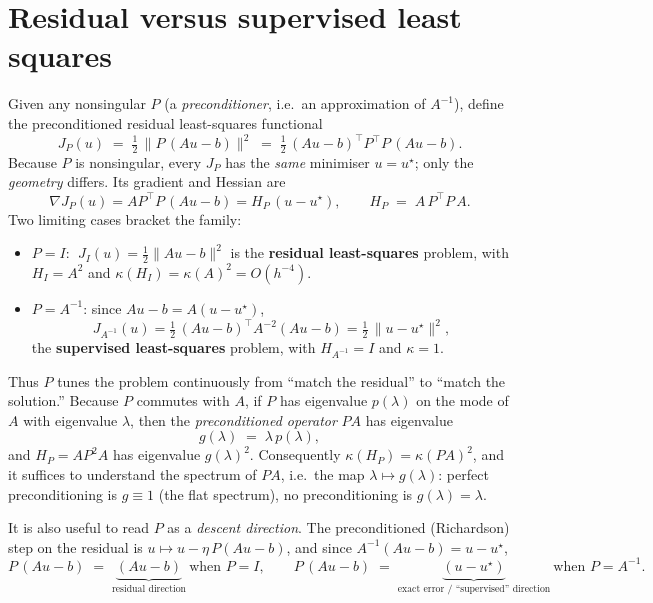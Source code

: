 \documentclass[11pt]{article}
\newcommand{\kk}{\kappa}
\newcommand{\ustar}{u^\star}
\begin{document}
\section{Residual versus supervised least squares}

Given any nonsingular $P$ (a \emph{preconditioner}, i.e.\ an approximation of $A^{-1}$),
define the preconditioned residual least-squares functional
\begin{equation}
  J_P(u) \;=\; \tfrac12\,\big\| P\,(Au-b) \big\|^2
          \;=\; \tfrac12\,(Au-b)^\top P^\top P\,(Au-b).
  \label{eq:JP}
\end{equation}
Because $P$ is nonsingular, every $J_P$ has the \emph{same} minimiser $u=\ustar$; only the
\emph{geometry} differs. Its gradient and Hessian are
\begin{equation}
  \nabla J_P(u) = A P^\top P\,(Au-b) = H_P\,(u-\ustar),
  \qquad
  H_P \;=\; A\,P^\top P\,A .
  \label{eq:hessian}
\end{equation}
Two limiting cases bracket the family:
\begin{itemize}
  \item $P=I$: $\;J_I(u)=\tfrac12\|Au-b\|^2$ is the \textbf{residual least-squares}
        problem, with $H_I = A^2$ and $\kk(H_I)=\kk(A)^2 = O(h^{-4})$.
  \item $P=A^{-1}$: since $Au-b = A(u-\ustar)$,
        \begin{equation}
          J_{A^{-1}}(u) = \tfrac12\,(Au-b)^\top A^{-2}(Au-b)
                        = \tfrac12\,\|u-\ustar\|^2 ,
        \end{equation}
        the \textbf{supervised least-squares} problem, with $H_{A^{-1}}=I$ and $\kk=1$.
\end{itemize}
Thus $P$ tunes the problem continuously from ``match the residual'' to ``match the
solution.'' Because $P$ commutes with $A$, if $P$ has eigenvalue $p(\lambda)$ on the mode of
$A$ with eigenvalue $\lambda$, then the \emph{preconditioned operator} $PA$ has eigenvalue
\begin{equation}
  g(\lambda) \;=\; \lambda\,p(\lambda),
\end{equation}
and $H_P=A P^2 A$ has eigenvalue $g(\lambda)^2$. Consequently
$\kk(H_P)=\kk(PA)^2$, and it suffices to understand the spectrum of $PA$, i.e.\ the map
$\lambda\mapsto g(\lambda)$: perfect preconditioning is $g\equiv1$ (the flat spectrum), no
preconditioning is $g(\lambda)=\lambda$.

It is also useful to read $P$ as a \emph{descent direction}. The preconditioned
(Richardson) step on the residual is $u\mapsto u-\eta\,P(Au-b)$, and since
$A^{-1}(Au-b)=u-\ustar$,
\begin{equation}
  P\,(Au-b) \;=\; \underbrace{(Au-b)}_{\text{residual direction}}
      \ \text{when }P=I,
  \qquad
  P\,(Au-b) \;=\; \underbrace{(u-\ustar)}_{\text{exact error / ``supervised'' direction}}
      \ \text{when }P=A^{-1}.
  \label{eq:directions}
\end{equation}
\end{document}
